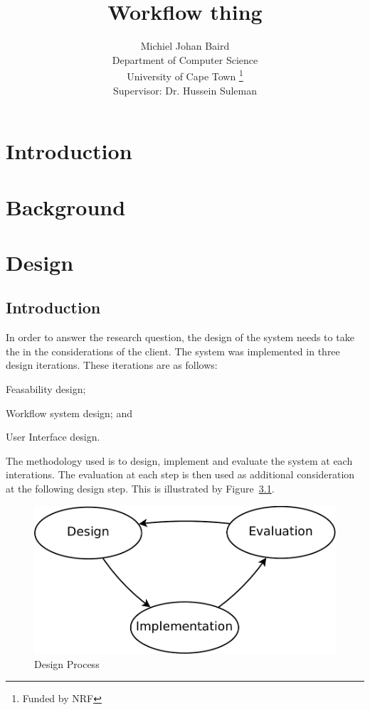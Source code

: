 \documentclass[12pt,a4paper]{report}
\title{Workflow thing}
\author{Michiel Johan Baird \\
        Department of Computer Science \\
        University of Cape Town
        \thanks{Funded by NRF}
    \\   \small{Supervisor: Dr. Hussein Suleman} }
\begin{document}
\maketitle
\newpage
\tableofcontents
\newpage
\listoffigures
\newpage
\chapter{Introduction}
\chapter{Background}
\chapter{Design}
\section{Introduction}
In order to answer the research question, the design of the system needs
to take the in the considerations of the client. The  system
was implemented in three design iterations. These iterations are
as follows: \begin{inparaenum}[(i)] \item Feasability design;
\item Workflow system design; and \item User Interface design.
\end{inparaenum} The methodology used is to design, implement
and evaluate the system at each interations. The evaluation at
each step is then used as additional consideration at the following
design step. This is illustrated by Figure~\ref{design_figure}.

\begin{figure}[!h]
\begin{center}
\includegraphics[scale=0.5]{figures/design_cycle.pdf}
\end{center}
\caption{Design Process}
\label{design_figure}
\end{figure}
\end{document}
